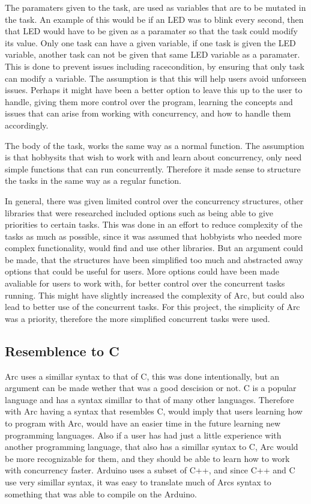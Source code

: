The paramaters given to the task, are used as variables that are to be mutated in the task. An example of this would be if an LED was to blink every second, then that LED would have to be given as a paramater so that the task could modify its value. Only one task can have a given variable, if one task is given the LED variable, another task can not be given that same LED variable as a paramater. This is done to prevent issues including racecondition, by ensuring that only task can modify a variable. The assumption is that this will help users avoid unforseen issues. Perhaps it might have been a better option to leave this up to the user to handle, giving them more control over the program, learning the concepts and issues that can arise from working with concurrency, and how to handle them accordingly.

The body of the task, works the same way as a normal function. The assumption is that hobbysits that wish to work with and learn about concurrency, only need simple functions that can run concurrently. Therefore it made sense to structure the tasks in the same way as a regular function.

In general, there was given limited control over the concurrency structures, other libraries that were researched included options such as being able to give priorities to certain tasks. This was done in an effort to reduce complexity of the tasks as much as possible, since it was assumed that hobbyists who needed more complex functionality, would find and use other libraries. But an argument could be made, that the structures have been simplified too much and abstracted away options that could be useful for users. More options could have been made avaliable for users to work with, for better control over the concurrent tasks running. This might have slightly increased the complexity of Arc, but could also lead to better use of the concurrent tasks. For this project, the simplicity of Arc was a priority, therefore the more simplified concurrent tasks were used.


\subsection{Resemblence to C}
Arc uses a simillar syntax to that of C, this was done intentionally, but an argument can be made wether that was a good descision or not. C is a popular language and has a syntax simillar to that of many other languages. Therefore with Arc having a syntax that resembles C, would imply that users learning how to program with Arc, would have an easier time in the future learning new programming languages. Also if a user has had just a little experience with another programming language, that also has a simillar syntax to C, Arc would be more recognizable for them, and they should be able to learn how to work with concurrency faster. Arduino uses a subset of C++, and since C++ and C use very simillar syntax, it was easy to translate much of Arcs syntax to something that was able to compile on the Arduino.

